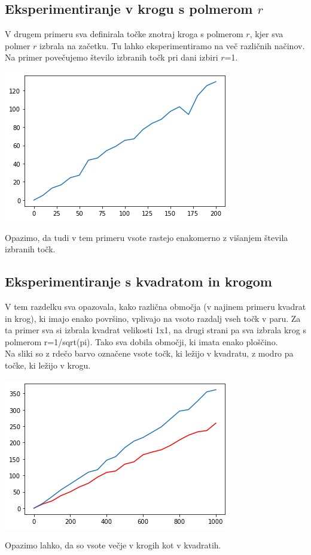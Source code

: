 \documentclass[12pt, a4paper]{article}
\begin{document}
\subsection{Eksperimentiranje v krogu s polmerom $r$}
V drugem primeru sva definirala točke znotraj kroga s polmerom $r$, kjer sva polmer $r$ izbrala na začetku. Tu lahko eksperimentiramo na več različnih načinov.
Na primer povečujemo število izbranih točk pri dani izbiri $r$=1.
\begin{center}
\includegraphics{krog_s_danim_polmerom.png}
\end{center}
Opazimo, da tudi v tem primeru vsote rastejo enakomerno z višanjem števila izbranih točk.
	

\subsection{Eksperimentiranje s kvadratom in krogom}
V tem razdelku sva opazovala, kako različna območja (v najinem primeru kvadrat in krog), ki imajo enako površino, vplivajo na vsoto razdalj vseh točk v paru. Za ta primer sva si izbrala kvadrat velikosti 1x1, na drugi strani pa sva izbrala krog s polmerom r=1/sqrt(pi). Tako sva dobila območji, ki imata enako ploščino.\\

\newpage
Na sliki so z rdečo barvo označene vsote točk, ki ležijo v kvadratu, z modro pa točke, ki ležijo v krogu.\\
\begin{center}
\includegraphics{primerjava_krog_kvadrat_2.png}
\end{center}
Opazimo lahko, da so vsote večje v krogih kot v kvadratih.\\
\end{document}
